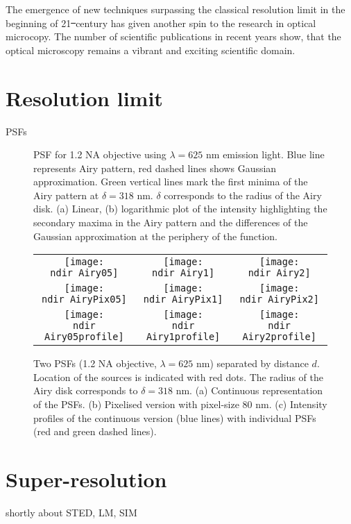 The emergence of new techniques surpassing the classical resolution limit in the beginning of 21\st\ century has given another spin to the research in optical microcopy. The number of scientific publications in recent years show, that the optical microscopy remains a vibrant and exciting scientific domain.


\section{Resolution limit}
PSFs

\begin{figure}[!bht]
	\centering
	\newcommand{\wf}{.48\textwidth}
	\caption{PSF for 1.2 NA objective using $\lambda=625$ nm emission light. Blue line represents Airy pattern, red dashed lines shows Gaussian approximation. Green vertical lines mark the first minima of the Airy pattern at $\delta=318$ nm. $\delta$ corresponds to the radius of the Airy disk. (a) Linear, (b) logarithmic plot of the intensity highlighting the secondary maxima in the Airy pattern and the differences of the Gaussian approximation at the periphery of the function.}
	\label{fig:PSF}
\end{figure}


\begin{figure}[!bht]
	\centering
	\newcommand{\wf}{.3\textwidth}	
	\newcommand{\ndir}{figures/psfillustration/}
	\begin{tabular}{ccc}
		\subfloat[$d=\delta/2$]{\texttt{[image: \\ndir Airy05]}}
		& \subfloat[$d=\delta$]{\texttt{[image: \\ndir Airy1]}}
		& \subfloat[$d=2\delta$]{\texttt{[image: \\ndir Airy2]}}
		\tabularnewline
		\subfloat[$d=\delta/2$]{\texttt{[image: \\ndir AiryPix05]}}
		& \subfloat[$d=\delta$]{\texttt{[image: \\ndir AiryPix1]}}
		& \subfloat[$d=2\delta$]{\texttt{[image: \\ndir AiryPix2]}}
		\tabularnewline
		\subfloat[$d=\delta/2$]{\texttt{[image: \\ndir Airy05profile]}}
		& \subfloat[$d=\delta$]{\texttt{[image: \\ndir Airy1profile]}}
		& \subfloat[$d=2\delta$]{\texttt{[image: \\ndir Airy2profile]}}
		\tabularnewline
	\end{tabular}
	\caption{Two PSFs (1.2 NA objective, $\lambda=625$ nm) separated by distance $d$. Location of the sources is indicated with red dots. The radius of the Airy disk corresponds to $\delta=318$ nm. (a) Continuous representation of the PSFs. (b) Pixelised version with pixel-size 80 nm. (c) Intensity profiles of the continuous version (blue lines) with individual PSFs (red and green dashed lines).}
	\label{fig:Rayleigh}
\end{figure}

\clearpage
\section{Super-resolution}
shortly about  STED, LM, SIM

